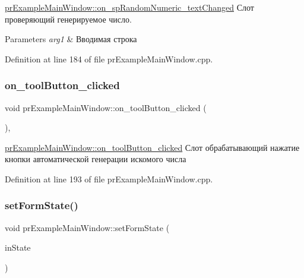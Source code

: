 \hyperlink{classpr_example_main_window_a2b65976cef6b714c6310ffb7156001c0}{pr\+Example\+Main\+Window\+::on\+\_\+sp\+Random\+Numeric\+\_\+text\+Changed} Слот проверяющий генерируемое число. 


\begin{DoxyParams}{Parameters}
{\em arg1} & Вводимая строка \\
\hline
\end{DoxyParams}


Definition at line 184 of file pr\+Example\+Main\+Window.\+cpp.

\mbox{\label{classpr_example_main_window_a0ea28061dcfe0502e84873ca91553a8b}} 
\subsubsection{\texorpdfstring{on\+\_\+tool\+Button\+\_\+clicked}{on\_toolButton\_clicked}}
{\footnotesize\ttfamily void pr\+Example\+Main\+Window\+::on\+\_\+tool\+Button\+\_\+clicked (\begin{DoxyParamCaption}{ }\end{DoxyParamCaption})\hspace{0.3cm}{\ttfamily [private]}, {\ttfamily [slot]}}



\hyperlink{classpr_example_main_window_a0ea28061dcfe0502e84873ca91553a8b}{pr\+Example\+Main\+Window\+::on\+\_\+tool\+Button\+\_\+clicked} Слот обрабатывающий нажатие кнопки автоматической генерации искомого числа 



Definition at line 193 of file pr\+Example\+Main\+Window.\+cpp.

\mbox{\label{classpr_example_main_window_abbb7d4ab8838740081570c5c6b2a8f60}} 
\subsubsection{\texorpdfstring{set\+Form\+State()}{setFormState()}}
{\footnotesize\ttfamily void pr\+Example\+Main\+Window\+::set\+Form\+State (\begin{DoxyParamCaption}\item[{\hyperlink{classpr_example_main_window_ac6ea07691b05604b1dda8ec6263c028c}{pr\+Example\+Main\+Window\+::pr\+State}}]{in\+State }\end{DoxyParamCaption})\hspace{0.3cm}{\ttfamily [private]}}



